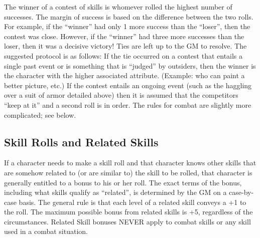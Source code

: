 \documentclass[twoside]{book}
\begin{document}
   The winner of a contest of skills is whomever rolled
               the highest number of successes. The margin of success is
               based on the difference between the two rolls. For
               example, if the “winner” had only 1 more
               success than the “loser”, then the contest was
               close. However, if the “winner” had three more
               successes than the loser, then it was a decisive victory!
                Ties are left up to the GM to resolve. The suggested
               protocol is as follows:  If the tie occurred on a contest that entails a
               single past event or is something that is
               “judged” by outsiders, then the winner is the
               character with the higher associated attribute. (Example:
               who can paint a better picture, etc.)  If the contest entails an ongoing event (such as the
               haggling over a suit of armor detailed above) then it is
               assumed that the competitors “keep at it” and
               a second roll is in order.  The rules for combat are slightly more complicated;
               see below. 
\subsection{Skill Rolls and Related Skills}
     If a character needs to make a skill roll and that
               character knows other skills that are somehow related to
               (or are similar to) the skill to be rolled, that character
               is generally entitled to a bonus to his or her roll. The
               exact terms of the bonus, including what skills qualify as
               “related”, is determined by the GM on a
               case-by-case basis. The general rule is that each level of
               a related skill conveys a +1 to the roll. The maximum
               possible bonus from related skills is +5, regardless of
               the circumstances. 
   Related Skill bonuses NEVER apply to combat skills
               or any skill used in a combat situation. 
\end{document}
